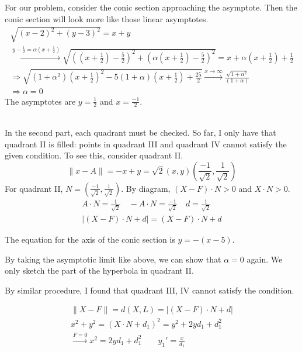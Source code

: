 \documentclass[twoside]{amsart}
\theoremstyle{plain}
\theoremstyle{definition}
\newcommand{\exercisehead}[1]
  {\smallskip
   \noindent{\small\bf Exercise #1.}}
\begin{document}
For our problem, consider the conic section approaching the asymptote.  Then the conic section will look more like those linear asymptotes.  
\[
\begin{gathered}
  \sqrt{ (x-2)^2 + (y-3)^2 } = x + y \\
  \xrightarrow{ y - \frac{1}{2} = \alpha \left( x + \frac{1}{2} \right) } \sqrt{ \left( \left( x + \frac{1}{2} \right) - \frac{5}{2} \right)^2 + \left( \alpha \left( x + \frac{1}{2} \right) - \frac{5}{2} \right)^2 } = x + \alpha \left( x + \frac{1}{2} \right) + \frac{1}{2}  \\
  \Longrightarrow \sqrt{ (1+ \alpha^2 ) \left( x + \frac{1}{2} \right)^2 - 5 (1 + \alpha) \left( x +  \frac{1}{2} \right) + \frac{25}{2} } \xrightarrow{x\to \infty} \frac{\sqrt{ 1 + \alpha^2}}{ (1+\alpha ) }  \\
  \Longrightarrow \alpha = 0
\end{gathered}
\]
The asymptotes are $y = \frac{1}{2}$ and $x = \frac{ -1}{2}$.  

\quad \\

In the second part, each quadrant must be checked.  So far, I only have that quadrant II is filled: points in quadrant III and quadrant IV cannot satisfy the given condition.  To see this, consider quadrant II.  
\[
  \| x - A \| = -x + y  = \sqrt{2} (x,y) \left( \frac{-1}{\sqrt{2}}, \frac{1}{ \sqrt{2}} \right) 
\]
For quadrant II, $N =  \left( \frac{-1}{\sqrt{2}}, \frac{1}{ \sqrt{2}} \right) $.  By diagram, $(X-F)\cdot N > 0$ and $X \cdot N >0$.  
\[
\begin{gathered}
  A \cdot N = \frac{1}{ \sqrt{2}} \quad - A \cdot N = \frac{-1}{\sqrt{2}} \quad d = \frac{1}{ \sqrt{2}} \\
  |(X-F)\cdot N + d | = (X-F) \cdot N + d 
\end{gathered}
\]

The equation for the axis of the conic section is $y=-(x-5)$.  

By taking the asymptotic limit like above, we can show that $\alpha = 0 $ again.  We only sketch the part of the hyperbola in quadrant II.  

By similar procedure, I found that quadrant III, IV cannot satisfy the condition.  

\exercisehead{19}
\[
\begin{gathered}
  \| X-F \| = d(X,L) = | (X-F)\cdot N + d | \\
  x^2 + y^2 = (X\cdot N +d_1)^2 = y^2 + 2y d_1 +d_1^2 \\
  \xrightarrow{ F = 0 } x^2 = 2yd_1 + d_1^2 \quad \quad y_1' = \frac{x}{d_1} 
\end{gathered}
\]
\end{document}
